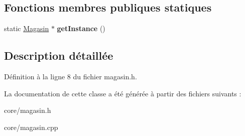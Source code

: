 \subsection*{Fonctions membres publiques statiques}
\begin{DoxyCompactItemize}
\item 
\hypertarget{class_core_1_1_magasin_a1a9f32f9d91cf3e41d96cabb87593940}{
static \hyperlink{class_core_1_1_magasin}{Magasin} $\ast$ {\bfseries getInstance} ()}
\label{db/d58/class_core_1_1_magasin_a1a9f32f9d91cf3e41d96cabb87593940}

\end{DoxyCompactItemize}


\subsection{Description détaillée}


Définition à la ligne 8 du fichier magasin.h.



La documentation de cette classe a été générée à partir des fichiers suivants :\begin{DoxyCompactItemize}
\item 
core/magasin.h\item 
core/magasin.cpp\end{DoxyCompactItemize}
